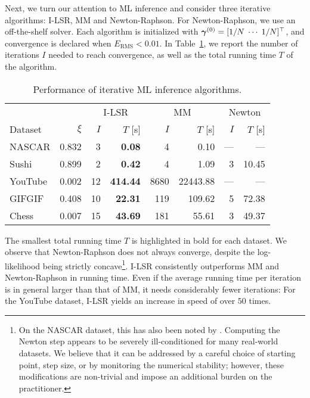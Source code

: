 Next, we turn our attention to ML inference and consider three iterative algorithms: I-LSR, MM and Newton-Raphson.
For Newton-Raphson, we use an off-the-shelf solver.
Each algorithm is initialized with $\bm{\gamma}^{(0)} = [1/N \; \cdots \; 1/N]^\top$, and convergence is declared when $E_{\text{RMS}} < 0.01$.
In Table~\ref{fi:tab:mlalg}, we report the number of iterations $I$ needed to reach convergence, as well as the total running time $T$ of the algorithm.

\begin{table}[ht]
  \caption{Performance of iterative ML inference algorithms.}
  \label{fi:tab:mlalg}
  \centering
  \small{
  \begin{tabular}{l r rr rr rr}
    \toprule
             &             & \multicolumn{2}{c}{I-LSR}        & \multicolumn{2}{c}{MM}      & \multicolumn{2}{c}{Newton} \\
                             \cmidrule(l){3-4}                  \cmidrule(l){5-6}             \cmidrule(l){7-8}
    Dataset  & $\xi$               & $I$ &         $T$ [s] &        $I$ &        $T$ [s] &     $I$ &     $T$ [s] \\
    \midrule
    NASCAR   & \num{0.832} &  \num{3} &   \bfseries\num{0.08} &    \num{4} &     \num{0.10} &     --- &         --- \\
    Sushi    & \num{0.899} &  \num{2} &   \bfseries\num{0.42} &    \num{4} &     \num{1.09} & \num{3} & \num{10.45} \\
    \addlinespace
    YouTube  & \num{0.002} & \num{12} & \bfseries\num{414.44} & \num{8680} & \num{22443.88} &     --- &         --- \\
    GIFGIF   & \num{0.408} & \num{10} &  \bfseries\num{22.31} &  \num{119} &   \num{109.62} & \num{5} & \num{72.38} \\
    \addlinespace
    Chess    & \num{0.007} & \num{15} &  \bfseries\num{43.69} &  \num{181} &    \num{55.61} & \num{3} & \num{49.37} \\
    \bottomrule
  \end{tabular}
  }
\end{table}

The smallest total running time $T$ is highlighted in bold for each dataset.
We observe that Newton-Raphson does not always converge, despite the log-likelihood being strictly concave\footnote{
On the NASCAR dataset, this has also been noted by \citet{hunter2004mm}.
Computing the Newton step appears to be severely ill-conditioned for many real-world datasets.
We believe that it can be addressed by a careful choice of starting point, step size, or by monitoring the numerical stability;
however, these modifications are non-trivial and impose an additional burden on the practitioner.
}.
I-LSR consistently outperforms MM and Newton-Raphson in running time.
Even if the average running time per iteration is in general larger than that of MM, it needs considerably fewer iterations:
For the YouTube dataset, I-LSR yields an increase in speed of over $50$ times.

